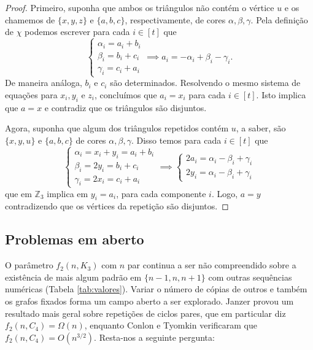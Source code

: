 \documentclass[11pt,twoside,a4paper]{book}
\def\ZZ{\mathds Z}
\theoremstyle{note}
\def\ZZ{{\mathbb Z}}
\def\ZZ{{\mathbb Z}}
\begin{document}
\begin{proof}
        Primeiro, suponha que ambos os triângulos não contém o vértice $u$ e os chamemos de $\{x,y,z\}$ e $\{a,b,c\}$, respectivamente, de cores $\alpha, \beta, \gamma$. Pela definição de $\chi$ podemos escrever para cada $i \in [t]$ que
        \[
            \left\{\begin{matrix}
            \alpha_i = a_i +b_i\\ 
            \beta_i = b_i+c_i\\ 
            \gamma_i = c_i+a_i
            \end{matrix}\right.
            \implies a_i = -\alpha_i+\beta_i-\gamma_i.
        \]
        De maneira análoga, $b_i$ e $c_i$ são determinados. 
        Resolvendo o mesmo sistema de equações para $x_i, y_i$ e $z_i$,
        concluímos que $a_i = x_i$ para cada $i \in [t]$.
        Isto implica que $a = x$ e contradiz que os triângulos são disjuntos.
        
        Agora, suponha que algum dos triângulos repetidos contém $u$, a saber, são $\{x,y,u\}$ e $\{a,b,c\}$ de cores $\alpha, \beta, \gamma$. 
        Disso temos para cada $i \in [t]$ que
        \[
            \left\{\begin{matrix}
            \alpha_i = x_i+y_i = a_i +b_i\\ 
            \beta_i = 2y_i = b_i+c_i\\ 
            \gamma_i = 2x_i = c_i+a_i
            \end{matrix}\right.
            \implies 
            \left\{\begin{matrix}
            2a_i = \alpha_i - \beta_i + \gamma_i\\ 
            2y_i = \alpha_i - \beta_i + \gamma_i
            \end{matrix}\right.
        \]
        que em $\ZZ_3$ implica em $y_i = a_i$, para cada componente $i$. Logo, $a = y$ contradizendo que os vértices da repetição  são disjuntos.
    \end{proof}
    
    \subsection{Problemas em aberto}
\label{subsec:repeated-prob}

        O parâmetro $f_2(n, K_3)$ com $n$ par continua a ser não compreendido sobre a existência de mais algum padrão em $\{n-1,n,n+1\}$ com outras sequências numéricas (Tabela \ref{tab:valores}).
        Variar o número de cópias de outros e também os grafos fixados forma um campo aberto a ser explorado.
        Janzer \cite{janzer2020rainbow} provou um resultado mais geral sobre repetições de ciclos pares, que em particular diz  $f_2(n, C_4) = \Omega(n)$, enquanto Conlon e Tyomkin \cite{conlontyomkyn} verificaram que $f_2(n, C_4) = O(n^{3/2})$. Resta-nos a seguinte pergunta:
        
\end{document}
